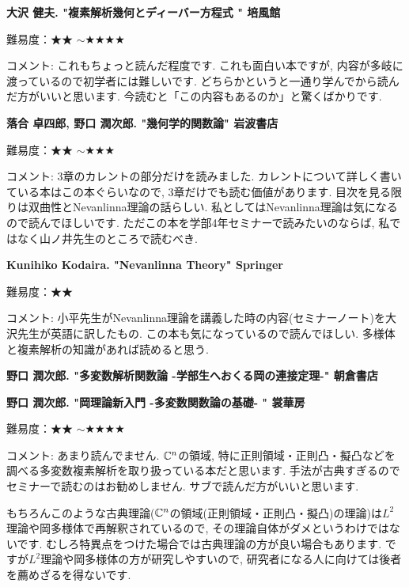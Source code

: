\textbf{大沢 健夫. "複素解析幾何とディーバー方程式 " 培風館}  　\vspace{-6pt} 

難易度：★★ $\sim$★★★★ 　\vspace{-6pt} 

コメント: これもちょっと読んだ程度です. これも面白い本ですが, 内容が多岐に渡っているので初学者には難しいです.
どちらかというと一通り学んでから読んだ方がいいと思います. 今読むと「この内容もあるのか」と驚くばかりです. 
\vspace{8pt}


\textbf{落合 卓四郎, 野口 潤次郎. "幾何学的関数論" 岩波書店}  　\vspace{-6pt} 

難易度：★★ $\sim$★★★ 　\vspace{-6pt} 

コメント: 3章のカレントの部分だけを読みました. カレントについて詳しく書いている本はこの本ぐらいなので, 3章だけでも読む価値があります. 目次を見る限りは双曲性とNevanlinna理論の話らしい. 私としてはNevanlinna理論は気になるので読んでほしいです. ただこの本を学部4年セミナーで読みたいのならば, 私ではなく山ノ井先生のところで読むべき.
\vspace{8pt}

\textbf{Kunihiko Kodaira. "Nevanlinna Theory" Springer}  　\vspace{-6pt} 

難易度：★★ 　\vspace{-6pt} 

コメント: 小平先生がNevanlinna理論を講義した時の内容(セミナーノート)を大沢先生が英語に訳したもの. この本も気になっているので読んでほしい. 多様体と複素解析の知識があれば読めると思う. 
\vspace{8pt}

\textbf{野口 潤次郎. "多変数解析関数論 -学部生へおくる岡の連接定理-" 朝倉書店}  　\vspace{-6pt} 

\textbf{野口 潤次郎. "岡理論新入門 -多変数関数論の基礎- "  裳華房}  　\vspace{-6pt} 

難易度：★★ $\sim$★★★★ 　\vspace{-6pt} 

コメント: あまり読んでません. $\mathbb{C}^n$の領域, 特に正則領域・正則凸・擬凸などを調べる多変数複素解析を取り扱っている本だと思います. 手法が古典すぎるのでセミナーで読むのはお勧めしません. サブで読んだ方がいいと思います.

もちろんこのような古典理論($\mathbb{C}^n$の領域(正則領域・正則凸・擬凸)の理論)は$L^2$理論や岡多様体で再解釈されているので, その理論自体がダメというわけではないです. 
むしろ特異点をつけた場合では古典理論の方が良い場合もあります. 
ですが$L^2$理論や岡多様体の方が研究しやすいので, 研究者になる人に向けては後者を薦めざるを得ないです. 

